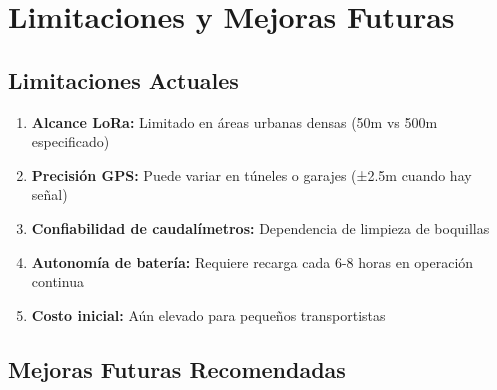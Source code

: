 \documentclass[12pt,a4paper,oneside]{report}
\begin{document}
\section{Limitaciones y Mejoras Futuras}

\subsection{Limitaciones Actuales}

\begin{enumerate}
    \item \textbf{Alcance LoRa:} Limitado en áreas urbanas densas (50m vs 500m especificado)
    
    \item \textbf{Precisión GPS:} Puede variar en túneles o garajes (±2.5m cuando hay señal)
    
    \item \textbf{Confiabilidad de caudalímetros:} Dependencia de limpieza de boquillas
    
    \item \textbf{Autonomía de batería:} Requiere recarga cada 6-8 horas en operación continua
    
    \item \textbf{Costo inicial:} Aún elevado para pequeños transportistas
\end{enumerate}

\subsection{Mejoras Futuras Recomendadas}
\end{document}
